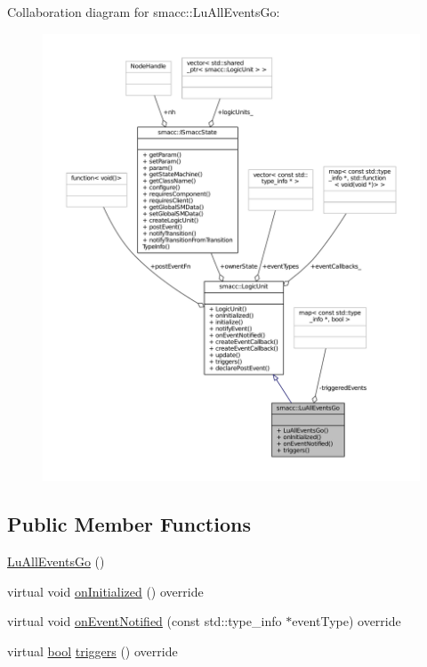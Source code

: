 Collaboration diagram for smacc\+:\+:Lu\+All\+Events\+Go\+:
\nopagebreak
\begin{figure}[H]
\begin{center}
\leavevmode
\includegraphics[width=350pt]{classsmacc_1_1LuAllEventsGo__coll__graph}
\end{center}
\end{figure}
\subsection*{Public Member Functions}
\begin{DoxyCompactItemize}
\item 
\hyperlink{classsmacc_1_1LuAllEventsGo_a2454977040a1e48e50668313de434264}{Lu\+All\+Events\+Go} ()
\item 
virtual void \hyperlink{classsmacc_1_1LuAllEventsGo_a176ccd3e4abc80d028d2d7d6a87943bd}{on\+Initialized} () override
\item 
virtual void \hyperlink{classsmacc_1_1LuAllEventsGo_a5f63f470cf4338e698e567d96b6c6dca}{on\+Event\+Notified} (const std\+::type\+\_\+info $\ast$event\+Type) override
\item 
virtual \hyperlink{classbool}{bool} \hyperlink{classsmacc_1_1LuAllEventsGo_a277c070161ccc7ed564961b113f39c95}{triggers} () override
\end{DoxyCompactItemize}
